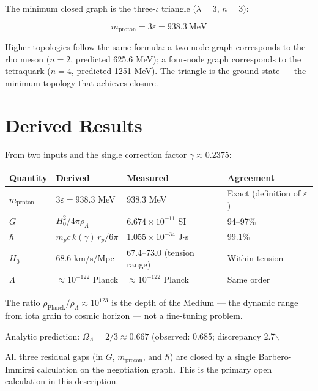 \documentclass[11pt,letterpaper]{article}
\begin{document}
The minimum closed graph is the three-\(\iota\) triangle (\(\lambda = 3\), \(n = 3\)):

\begin{equation}
m_\text{proton} = 3\varepsilon = 938.3\ \text{MeV}
\end{equation}

Higher topologies follow the same formula: a two-node graph corresponds to the rho meson (\(n=2\), predicted 625.6 MeV); a four-node graph corresponds to the tetraquark (\(n=4\), predicted 1251 MeV). The triangle is the ground state --- the minimum topology that achieves closure.

\section{Derived Results}
\label{sec:org56fb0dc}

From two inputs and the single correction factor \(\gamma \approx 0.2375\):

\begin{center}
\begin{tabular}{llll}
\toprule
\textbf{Quantity} & \textbf{Derived} & \textbf{Measured} & \textbf{Agreement}\\[0pt]
\midrule
\(m_\text{proton}\) & \(3\varepsilon = 938.3\) MeV & 938.3 MeV & Exact (definition of \(\varepsilon\))\\[0pt]
\(G\) & \(H_0^2 / 4\pi\rho_\Lambda\) & \(6.674\times10^{-11}\) SI & 94--97\%\\[0pt]
\(\hbar\) & \(m_p c\,k(\gamma)\,r_p / 6\pi\) & \(1.055\times10^{-34}\) J\(\cdot\)s & 99.1\%\\[0pt]
\(H_0\) & 68.6 km/s/Mpc & 67.4--73.0 (tension range) & Within tension\\[0pt]
\(\Lambda\) & \(\approx 10^{-122}\) Planck & \(\approx 10^{-122}\) Planck & Same order\\[0pt]
\bottomrule
\end{tabular}
\end{center}

The ratio \(\rho_\text{Planck}/\rho_\Lambda \approx 10^{123}\) is the depth of the Medium --- the dynamic range from iota grain to cosmic horizon --- not a fine-tuning problem.

Analytic prediction: \(\Omega_\Lambda = 2/3 \approx 0.667\) (observed: 0.685; discrepancy 2.7$\backslash$%

All three residual gaps (in \(G\), \(m_\text{proton}\), and \(\hbar\)) are closed by a single Barbero-Immirzi calculation on the negotiation graph. This is the primary open calculation in this description.
\end{document}
